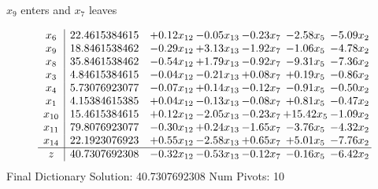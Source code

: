 \documentclass[9pt]{article}
\begin{document}
 $ x_{9} $ enters and $ x_{7} $ leaves 

 \[\begin{array}{c| c c@{\hskip 2pt} c@{\hskip 2pt} c@{\hskip 2pt} c@{\hskip 2pt} c@{\hskip 2pt} }
 x_{6}   &  22.4615384615 & +  0.12 x_{12} & -0.05 x_{13} & -0.23 x_{7} & -2.58 x_{5} & -5.09 x_{2}\\
 x_{9}   &  18.8461538462 & -0.29 x_{12} & +  3.13 x_{13} & -1.92 x_{7} & -1.06 x_{5} & -4.78 x_{2}\\
 x_{8}   &  35.8461538462 & -0.54 x_{12} & +  1.79 x_{13} & -0.92 x_{7} & -9.31 x_{5} & -7.36 x_{2}\\
 x_{3}   &  4.84615384615 & -0.04 x_{12} & -0.21 x_{13} & +  0.08 x_{7} & +  0.19 x_{5} & -0.86 x_{2}\\
 x_{4}   &  5.73076923077 & -0.07 x_{12} & +  0.14 x_{13} & -0.12 x_{7} & -0.91 x_{5} & -0.50 x_{2}\\
 x_{1}   &  4.15384615385 & +  0.04 x_{12} & -0.13 x_{13} & -0.08 x_{7} & +  0.81 x_{5} & -0.47 x_{2}\\
 x_{10}   &  15.4615384615 & +  0.12 x_{12} & -2.05 x_{13} & -0.23 x_{7} & + 15.42 x_{5} & -1.09 x_{2}\\
 x_{11}   &  79.8076923077 & -0.30 x_{12} & +  0.24 x_{13} & -1.65 x_{7} & -3.76 x_{5} & -4.32 x_{2}\\
 x_{14}   &  22.1923076923 & +  0.55 x_{12} & -2.58 x_{13} & +  0.65 x_{7} & +  5.01 x_{5} & -7.76 x_{2}\\
\hline
z    &  40.7307692308 & -0.32 x_{12} & -0.53 x_{13} & -0.12 x_{7} & -0.16 x_{5} & -6.42 x_{2}\\
\end{array}\]
Final Dictionary
Solution:  40.7307692308
Num Pivots:  10
\end{document}
